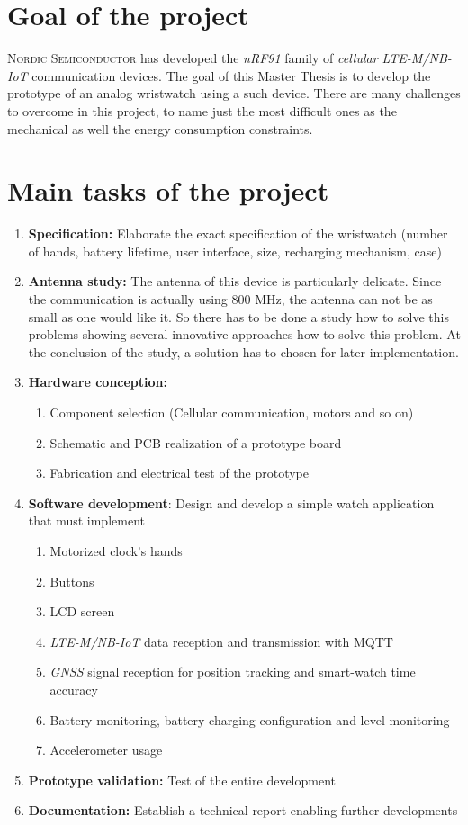 \documentclass[Report.tex]{subfiles}
\begin{document}
\section*{Goal of the project}

\textsc{Nordic Semiconductor} has developed the \textit{nRF91} family of \textit{cellular LTE-M/NB-IoT} communication devices. The goal of this Master Thesis is to develop the prototype of an analog wristwatch using a such device. There are many challenges to overcome in this project, to name just the most difficult ones as the mechanical as well the energy consumption constraints.

\pagebreak

\section*{Main tasks of the project}

\begin{enumerate}
\item \textbf{Specification:} Elaborate the exact specification of the wristwatch (number of hands, battery lifetime, user interface, size, recharging mechanism, case)
\item \textbf{Antenna study:} The antenna of this device is particularly delicate. Since the communication is actually using 800 MHz, the antenna can not be as small as one would like it. So there has to be done a study how to solve this problems showing several innovative approaches how to solve this problem. At the conclusion of the study, a solution has to chosen for later implementation.
\item \textbf{Hardware conception:}
\begin{enumerate}
	\item Component selection (Cellular communication, motors and so on)
	\item Schematic and PCB realization of a prototype board 
	\item Fabrication and electrical test of the prototype
\end{enumerate} 
\item \textbf{Software development}: Design and develop a simple watch application that must implement
\begin{enumerate}
\item Motorized clock’s hands
\item Buttons
\item LCD screen
\item \textit{LTE-M/NB-IoT} data reception and transmission with MQTT
\item \textit{GNSS} signal reception for position tracking and smart-watch time accuracy
\item Battery monitoring, battery charging configuration and level monitoring
\item Accelerometer usage
\end{enumerate}
\item \textbf{Prototype validation:} Test of the entire development
\item \textbf{Documentation:} Establish a technical report enabling further developments
\end{enumerate}
\end{document}

